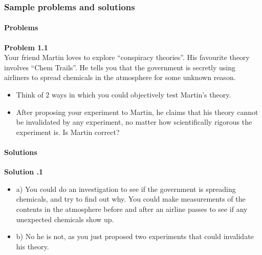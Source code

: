\subsubsection{Sample problems and solutions}

\paragraph{Problems}

\begin{framed}
\textbf{Problem 1.1}\\
Your friend Martin loves to explore ``conspiracy theories''. His favourite theory involves ``Chem Trails''. He tells you that the government is secretly using airliners to spread chemicals in the atmosphere for some unknown reason.

\begin{itemize}
\item Think of 2 ways in which you could objectively test Martin's theory.
\item After proposing your experiment to Martin, he claims that his theory cannot be invalidated by any experiment, no matter how scientifically rigorous the experiment is. Is Martin correct?
\end{itemize}
\end{framed}

\paragraph{Solutions}

\begin{framed}
\textbf{Solution .1}\\
\begin{itemize}
\item a) You could do an investigation to see if the government is spreading chemicals, and try to find out why. You could make measurements of the contents in the atmosphere before and after an airline passes to see if any unexpected chemicals show up.


\item b) No he is not, as you just proposed two experiments that could invalidate his theory.
\end{itemize}
\end{framed}